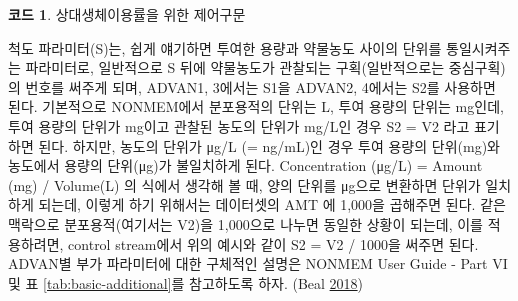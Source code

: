 \documentclass[
  10pt,
  krantz2,
  a4paper]{krantz}
\theoremstyle{definition}
\theoremstyle{definition}
\newtheorem{example}{코드}[chapter]
\theoremstyle{definition}
\theoremstyle{remark}
\begin{document}
\begin{example}
\protect\hypertarget{exm:code-if}{}{\label{exm:code-if} }상대생체이용률을 위한 제어구문
\end{example}

척도 파라미터(S)는, 쉽게 얘기하면 투여한 용량과 약물농도 사이의 단위를 통일시켜주는 파라미터로, 일반적으로 S 뒤에 약물농도가 관찰되는 구획(일반적으로는 중심구획)의 번호를 써주게 되며, ADVAN1, 3에서는 S1을 ADVAN2, 4에서는 S2를 사용하면 된다. 기본적으로 NONMEM에서 분포용적의 단위는 L, 투여 용량의 단위는 mg인데, 투여 용량의 단위가 mg이고 관찰된 농도의 단위가 mg/L인 경우 S2 = V2 라고 표기하면 된다. 하지만, 농도의 단위가 μg/L (= ng/mL)인 경우 투여 용량의 단위(mg)와 농도에서 용량의 단위(μg)가 불일치하게 된다. Concentration (μg/L) = Amount (mg) / Volume(L) 의 식에서 생각해 볼 때, 양의 단위를 μg으로 변환하면 단위가 일치하게 되는데, 이렇게 하기 위해서는 데이터셋의 AMT 에 1,000을 곱해주면 된다. 같은 맥락으로 분포용적(여기서는 V2)을 1,000으로 나누면 동일한 상황이 되는데, 이를 적용하려면, control stream에서 위의 예시와 같이 S2 = V2 / 1000을 써주면 된다. ADVAN별 부가 파라미터에 대한 구체적인 설명은 NONMEM User Guide - Part VI 및 표 \ref{tab:basic-additional}를 참고하도록 하자. (Beal \protect\hyperlink{ref-nonmem}{2018})
\end{document}
